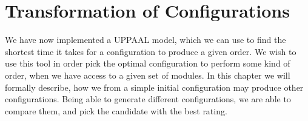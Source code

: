 \chapter{Transformation of Configurations} \label{ch:configuration}
We have now implemented a UPPAAL model, which we can use to find the shortest time it takes for a configuration to produce a given order. We wish to use this tool in order pick the optimal configuration to perform some kind of order, when we have access to a given set of modules. In this chapter we will formally describe, how we from a simple initial configuration may produce other configurations. Being able to generate different configurations, we are able to compare them, and pick the candidate with the best rating. 






